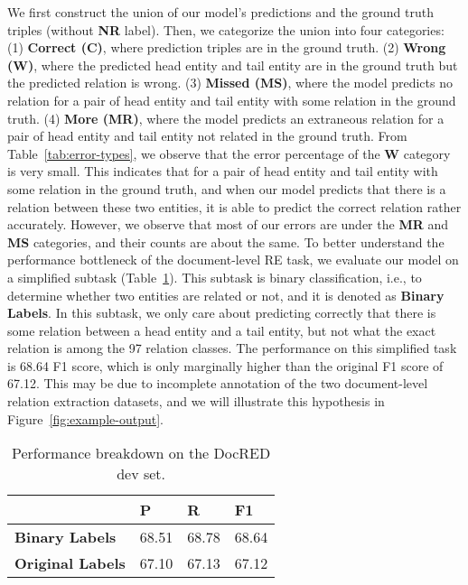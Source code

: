 \documentclass[11pt]{article}
\begin{document}
We first construct the union of our model's predictions and the ground truth triples (without \textbf{NR} label). Then, we categorize the union into four categories: (1) \textbf{Correct (C)}, where prediction triples are in the ground truth. (2) \textbf{Wrong (W)}, where the predicted head entity and tail entity are in the ground truth but the predicted relation is wrong. (3) \textbf{Missed (MS)}, where the model predicts no relation for a pair of head entity and tail entity with some relation in the ground truth. (4) \textbf{More (MR)}, where the model predicts an extraneous relation for a pair of head entity and tail entity not related in the ground truth. From Table~\ref{tab:error-types}, we observe that the error percentage of the \textbf{W} category is very small. This indicates that for a pair of head entity and tail entity with some relation in the ground truth, and when our model predicts that there is a relation between these two entities, it is able to predict the correct relation rather accurately. However, we observe that most of our errors are under the \textbf{MR} and \textbf{MS} categories, and their counts are about the same. To better understand the performance bottleneck of the document-level RE task, we evaluate our model on a simplified subtask (Table~\ref{tab:sub-task}). This subtask is binary classification, i.e., to determine whether two entities are related or not, and it is denoted as \textbf{Binary Labels}. In this subtask, we only care about predicting correctly that there is some relation between a head entity and a tail entity, but not what the exact relation is among the 97 relation classes. The performance on this simplified task is 68.64 F1 score, which is only marginally higher than the original F1 score of 67.12. This may be due to incomplete annotation of the two document-level relation extraction datasets, and we will illustrate this hypothesis in Figure~\ref{fig:example-output}.   




\begin{table}[ht]
\centering

\begin{tabular}{lrrr} 
\hline
                     & \multicolumn{1}{l}{P} & \multicolumn{1}{l}{R} & \multicolumn{1}{l}{F1}  \\ 
\hline
\textbf{Binary Labels}         & 68.51                 & 68.78                 & 68.64                   \\
\textbf{Original Labels}              & 67.10                  & 67.13                 & 67.12                   \\

\hline
\end{tabular}
\setlength{\abovecaptionskip}{2pt}
\caption{Performance breakdown on the DocRED dev set.}
\label{tab:sub-task}
\end{table}
\end{document}
